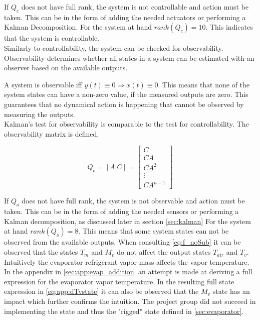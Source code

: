 If $Q_c$ does not have full rank, the system is not controllable and action must be taken. This can be in the form of adding the needed actuators or performing a Kalman Decomposition. For the system at hand $ rank(Q_c) = 10 $. This indicates that the system is controllable.\\

Similarly to controllability, the system can be checked for observability. Observability determines whether all states in a system can be estimated with an observer based on the available outputs.

\noindent A system is observable iff $y(t) \equiv 0 \Rightarrow x(t) \equiv 0$. This means that none of the system states can have a non-zero value, if the measured outputs are zero. This guarantees that no dynamical action is happening that cannot be observed by measuring the outputs.\\

Kalman's test for observability is comparable to the test for controllability. The observability matrix is defined.

\begin{equation}
	Q_o = [A|C] = \begin{bmatrix}
		C \\ CA \\ CA^2 \\ \vdots \\ CA^{n-1}
	\end{bmatrix}
\end{equation}

If $Q_o$ does not have full rank, the system is not observable and action must be taken. This can be in the form of adding the needed sensors or performing a Kalman decomposition, as discussed later in section \cref{sec:kalman}
For the system at hand $ rank(Q_o) = 8 $. This means that some system states can not be observed from the available outputs. When consulting \cref{eq:f_noSub} it can be observed that the states $T_m$ and $M_v$ do not affect the output states $T_{air}$ and $T_v$. Intuitively the evaporator refrigerant vapor mass affects the vapor temperature. In the appendix in \cref{sec:app:evap_addition} an attempt is made at deriving a full expression for the evaporator vapor temperature. In the resulting full state expression in \cref{eq:app:dTvstate} it can also be observed that the $M_v$ state has an impact which further confirms the intuition. The project group did not succeed in implementing the state and thus the "rigged" state defined in \cref{sec:evaporator}.

